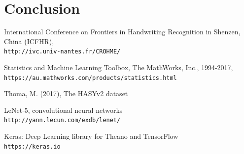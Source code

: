 \documentclass[twocolumn]{article}%
\begin{document}
	\section{Conclusion}
	
	\begin{thebibliography}{9}
		International Conference on Frontiers in Handwriting Recognition in Shenzen, China (ICFHR),
		\\\texttt{http://ivc.univ-nantes.fr/CROHME/}
		
		Statistics and Machine Learning Toolbox, The MathWorks, Inc., 1994-2017,
		\\\texttt{https://au.mathworks.com/products/statistics.html}
		
		Thoma, M. (2017), The HASYv2 dataset
		
		LeNet-5, convolutional neural networks
		\\\texttt{http://yann.lecun.com/exdb/lenet/}
		
		Keras: Deep Learning library for Theano and TensorFlow
		\\\texttt{https://keras.io}
		
		
	\end{thebibliography}
\end{document}
